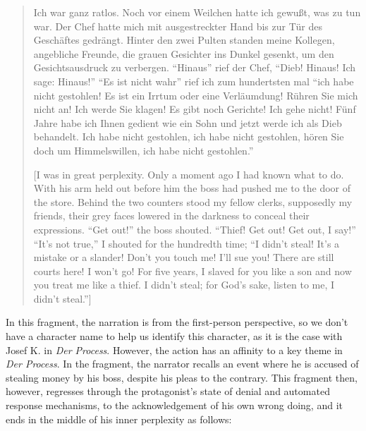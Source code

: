 \documentclass{article}
\begin{document}
\begin{quote}
Ich war ganz ratlos. Noch vor einem Weilchen hatte ich gewußt, was zu
tun war. Der Chef hatte mich mit ausgestreckter Hand bis zur Tür des
Geschäftes gedrängt. Hinter den zwei Pulten standen meine Kollegen,
angebliche Freunde, die grauen Gesichter ins Dunkel gesenkt, um den
Gesichtsausdruck zu verbergen. ``Hinaus'' rief der Chef, ``Dieb! Hinaus!
Ich sage: Hinaus!{}'' ``Es ist nicht wahr'' rief ich zum hundertsten mal
``ich habe nicht gestohlen! Es ist ein Irrtum oder eine Verläumdung!
Rühren Sie mich nicht an! Ich werde Sie klagen! Es gibt noch Gerichte!
Ich gehe nicht! Fünf Jahre habe ich Ihnen gedient wie ein Sohn und jetzt
werde ich als Dieb behandelt. Ich habe nicht gestohlen, ich habe nicht
gestohlen, hören Sie doch um Himmelswillen, ich habe nicht gestohlen.''

\begin{flushright}
    \parencite[667]{kafka_tagebucher_1990}
\end{flushright}

{[}I was in great perplexity. Only a moment ago I had known what to do.
With his arm held out before him the boss had pushed me to the door of
the store. Behind the two counters stood my fellow clerks, supposedly my
friends, their grey faces lowered in the darkness to conceal their
expressions. ``Get out!'' the boss shouted. ``Thief! Get out! Get out, I
say!'' ``It's not true,'' I shouted for the hundredth time; ``I didn't
steal! It's a mistake or a slander! Don't you touch me! I'll sue you!
There are still courts here! I won't go! For five years, I slaved for
you like a son and now you treat me like a thief. I didn't steal; for
God's sake, listen to me, I didn't steal.''{]} 

\begin{flushright}
    \parencite[298]{kafka_diaries_1975}
\end{flushright}

\end{quote}

In this fragment, the narration is from the first-person perspective, so
we don't have a character name to help us identify this character, as it
is the case with Josef K. in \emph{Der Process}. However, the action has
an affinity to a key theme in \emph{Der Process}. In the fragment, the
narrator recalls an event where he is accused of stealing money by his
boss, despite his pleas to the contrary. This fragment then, however,
regresses through the protagonist's state of denial and automated
response mechanisms, to the acknowledgement of his own wrong doing, and
it ends in the middle of his inner perplexity as follows:
\end{document}
